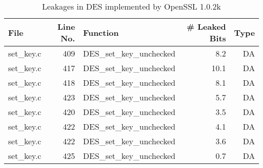 \begin{table}[!ht]
\centering\tiny\scriptsize
\caption{Leakages in DES implemented by OpenSSL 1.0.2k}\label{tab:DESOpenSSL1.0.2k}
\begin{tabular}{lrlrr}
\hline
\textbf{File} & \textbf{Line No.} & \textbf{Function} & \textbf{\# Leaked Bits} & \textbf{Type} \\\hline
set\_key.c& 409&DES\_set\_key\_unchecked&8.2 &DA\\
set\_key.c& 417&DES\_set\_key\_unchecked&10.1 &DA\\
set\_key.c& 418&DES\_set\_key\_unchecked&8.1 &DA\\
set\_key.c& 423&DES\_set\_key\_unchecked&5.7 &DA\\
set\_key.c& 420&DES\_set\_key\_unchecked&3.5 &DA\\
set\_key.c& 422&DES\_set\_key\_unchecked&4.1 &DA\\
set\_key.c& 422&DES\_set\_key\_unchecked&3.6 &DA\\
set\_key.c& 425&DES\_set\_key\_unchecked&0.7 &DA\\
\hline
\end{tabular}
\renewcommand{\baselinestretch}{1.0}\selectfont
\end{table}
